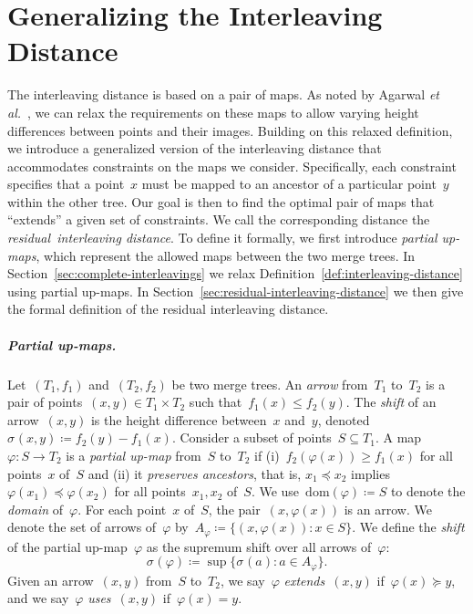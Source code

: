 \documentclass[11pt]{article}
\newcommand{\etal}{\emph{et al.}}
\newcommand{\dom}{\mathrm{dom}}
\newcommand{\shift}[1]{\sigma_{#1}}
\renewcommand{\phi}{\varphi}
\renewcommand{\mid}{:}
\begin{document}
\section{Generalizing the Interleaving Distance}\label{sec:generalizing-interleaving-distance}
The interleaving distance is based on a pair of maps.
As noted by Agarwal \etal~\cite{agarwal2018computing}, we can relax the requirements on these maps to allow varying height differences between points and their images.
Building on this relaxed definition, we introduce a generalized version of the interleaving distance that accommodates constraints on the maps we consider.
Specifically, each constraint specifies that a point~$x$ must be mapped to an ancestor of a particular point~$y$ within the other tree.
Our goal is then to find the optimal pair of maps that ``extends'' a given set of constraints.
We call the corresponding distance the \emph{residual~interleaving distance}.
To define it formally, we first introduce \emph{partial up-maps}, which represent the allowed maps between the two merge trees.
In Section~\ref{sec:complete-interleavings} we relax Definition~\ref{def:interleaving-distance} using partial up-maps.
In Section~\ref{sec:residual-interleaving-distance} we then give the formal definition of the residual interleaving distance.
%
\subparagraph{Partial up-maps.}
Let~$(T_1, f_1)$ and~$(T_2, f_2)$ be two merge trees.
An \emph{arrow} from~$T_1$ to~$T_2$ is a pair of points~$(x, y) \in T_1 \times T_2$ such that~$f_1(x) \le f_2(y)$.
The \emph{shift} of an arrow~$(x, y)$ is the height difference between~$x$ and~$y$, denoted~$\shift{}(x, y) \coloneqq f_2(y) - f_1(x)$.
Consider a subset of points~$S \subseteq T_1$.
A map~$\phi \colon S \to T_2$ is a \emph{partial up-map} from~$S$ to~$T_2$ if (i)~$f_2(\phi(x)) \ge f_1(x)$ for all points~$x$ of~$S$ and (ii) it \emph{preserves ancestors}, that is, $x_1 \preceq x_2$ implies~$\phi(x_1) \preceq \phi(x_2)$ for all points~$x_1, x_2$ of~$S$.
We use~$\dom(\phi) \coloneqq S$ to denote the \emph{domain} of~$\phi$.
For each point~$x$ of~$S$, the pair~$(x, \phi(x))$ is an arrow.
We denote the set of arrows of~$\phi$ by~$A_\phi \coloneqq \{(x, \phi(x)) \mid x \in S\}$.
We define the \emph{shift} of the partial up-map~$\phi$ as the supremum shift over all arrows of~$\phi$:
\begin{equation}\label{eq:shift}
    \shift{}(\phi) \coloneqq \sup\{\shift{}(a) \mid a \in A_\phi\}.
\end{equation}
%
Given an arrow~$(x, y)$ from~$S$ to~$T_2$, we say~$\phi$ \emph{extends}~$(x, y)$ if~$\phi(x) \succeq y$, and we say~$\phi$ \emph{uses}~$(x, y)$ if~$\phi(x) = y$.
\end{document}
